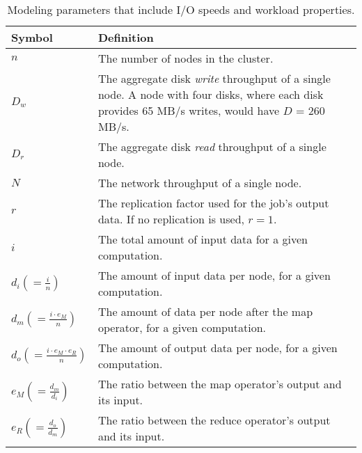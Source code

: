 {
\renewcommand{\baselinestretch}{1.0}
\begin{table}[t]
\centering
\begin{minipage}{1\textwidth}
\centering
\renewcommand{\arraystretch}{1.2}
\begin{tabular}{|l|p{13cm}|}
\hline
Symbol & Definition \\ \hline
$n$    & The number of nodes in the cluster. \\ \hline
$D_w$    & The aggregate disk \emph{write} throughput of a single node. A node with four disks, where each disk provides 65 MB/s writes, would have $D$ = 260
MB/s.
\\ \hline 
$D_r$    & The aggregate disk \emph{read} throughput of a single node. \\ \hline
$N$ & The network throughput of a single node.
\\ \hline 
$r$    & The replication factor used for the job's output data.  If no replication is used, $r=1$.  \\ \hline
$i$    & The total amount of input data for a given computation. \\ \hline
$d_i \left(= \frac{i}{n}\right)$  & The amount of input data per node, for a given computation. \\ \hline 
$d_m \left(= \frac{i \cdot e_M}{n}\right)$  & The amount of data per node after
the map operator, for a given computation. \\ \hline
$d_o \left(= \frac{i \cdot e_M \cdot e_R}{n}\right)$  & The amount of output
data per node, for a given computation. \\ \hline
$e_M \left(= \frac{d_m}{d_i}\right)$  & The ratio between the map operator's output and its input. \\ \hline
$e_R \left(= \frac{d_o}{d_m}\right)$  & The ratio between the reduce operator's output and its input.\\ \hline
\end{tabular}
\caption{Modeling parameters that include I/O speeds and workload properties.}
\label{table:symbols}
\end{minipage}
\end{table}
}

